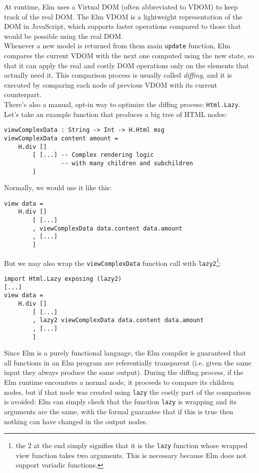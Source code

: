 At runtime, Elm uses a Virtual DOM (often abbreviated to VDOM) to keep track of the real DOM. The Elm VDOM is a lightweight representation of the DOM in JavaScript, which supports faster operations compared to those that would be possible using the real DOM. \cite{noauthor_htmllazy_nodate}\\

Whenever a new model is returned from them main \texttt{update} function, Elm compares the current VDOM with the next one computed using the new state, so that it can apply the real and costly DOM operations only on the elements that actually need it. This comparison process is usually called \textit{diffing}, and it is executed by comparing each node of previous VDOM with its current counterpart.\\

There's also a manual, opt-in way to optimize the diffing process: \texttt{Html.Lazy}. Let's take an example function that produces a big tree of HTML nodes:
\begin{verbatim}
viewComplexData : String -> Int -> H.Html msg
viewComplexData content amount =
    H.div []
        [ [...] -- Complex rendering logic 
                -- with many children and subchildren
        ]
\end{verbatim}

Normally, we would use it like this:
\begin{verbatim}
view data =
    H.div []
        [ [...]
        , viewComplexData data.content data.amount
        , [...]
        ]
\end{verbatim}

But we may also wrap the \texttt{viewComplexData} function call with \texttt{lazy2}\footnote[1]{the 2 at the end simply signifies that it is the \texttt{lazy} function whose wrapped view function takes two arguments. This is necessary because Elm does not support variadic functions.}:
\begin{verbatim}
import Html.Lazy exposing (lazy2)
[...]
view data =
    H.div []
        [ [...]
        , lazy2 viewComplexData data.content data.amount
        , [...]
        ]
\end{verbatim}


Since Elm is a purely functional language, the Elm compiler is guaranteed that all functions in an Elm program are referentially transparent (i.e. given the same input they always produce the same output). During the diffing process, if the Elm runtime encounters a normal node, it proceeds to compare its children nodes, but if that node was created using \texttt{lazy} the costly part of the comparison is avoided: Elm can simply check that the function \texttt{lazy} is wrapping and its arguments are the same, with the formal guarantee that if this is true then nothing can have changed in the output nodes.

